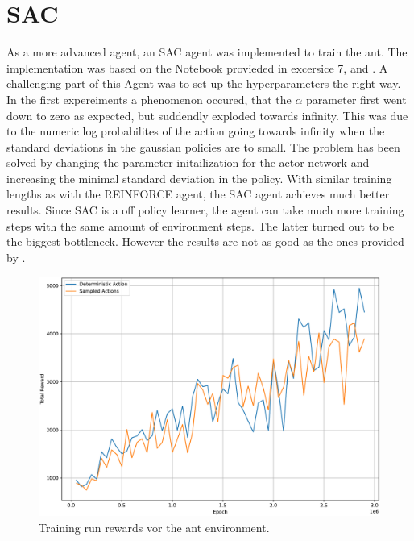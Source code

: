 \documentclass[11pt, a4paper]{article}
\begin{document}
\newpage
\section{SAC}
As a more advanced agent, an SAC agent was implemented to train the ant.
The implementation was based on the Notebook provieded in excersice 7, and \cite{haarnoja2018soft}.
A challenging part of this Agent was to set up the hyperparameters the right way.
In the first expereiments a phenomenon occured, that the $\alpha$ parameter first went down to zero as
expected, but suddendly exploded towards infinity.
This was due to the numeric log probabilites of the action going towards infinity when the standard deviations
in the gaussian policies are to small.
The problem has been solved by changing the parameter initailization for the actor network and increasing the minimal
standard deviation in the policy.
With similar training lengths as with the REINFORCE agent, the SAC agent achieves much better results.
Since SAC is a off policy learner, the agent can take much more training steps with the same amount of environment steps.
The latter turned out to be the biggest bottleneck.
However the results are not as good as the ones provided by \cite{haarnoja2018soft}.


\begin{figure}
    \centering
    \includegraphics[width=15cm]{stoc_det.pdf}
    \caption{Training run rewards vor the ant environment.}
    \label{SAC:test1}
\end{figure}
\end{document}
